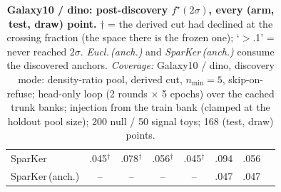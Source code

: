 \begin{table}[t]
\begin{tabular}{lcccccc c}
\quad SparKer & .045$^\dagger$ & .078$^\dagger$ & .056$^\dagger$ & .045$^\dagger$ & .094 & .056 \\
\quad SparKer\,(anch.) & -- & -- & -- & -- & .047 & .047 \\
\bottomrule
\end{tabular}
\caption{\textbf{Galaxy10 / dino: post-discovery $f^\star(2\sigma)$, every (arm, test, draw) point.} $\dagger$ = the derived cut had declined at the crossing fraction (the space there is the frozen one); `$>$.1' = never reached $2\sigma$.  \emph{Eucl.\,(anch.)} and \emph{SparKer\,(anch.)} consume the discovered anchors. \emph{Coverage:} Galaxy10 / dino, discovery mode: density-ratio pool, derived cut, $n_{\min}{=}5$, skip-on-refuse; head-only loop (2 rounds $\times$ 5 epochs) over the cached trunk banks; injection from the train bank (clamped at the holdout pool size); 200 null / 50 signal toys; 168 (test, draw) points.}
\label{tab:sigma_galaxy_post_dino}
\end{table}
